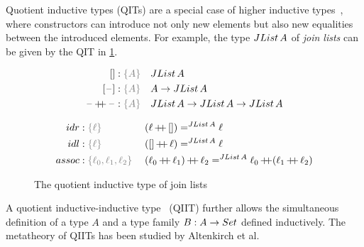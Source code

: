 \documentclass[a4paper,UKenglish,numberwithinsect,cleveref,thm-restate]{lipics-v2021}
\begin{document}
Quotient inductive types (QITs) are a special case of higher inductive types~\cite{Lumsdaine2020}, where constructors can introduce not only new elements but also new equalities between the introduced elements.
%
%
For example, the type $\JList{A}$ of \emph{join lists} can be given by the QIT in \cref{fig:QIT-join-list}.
\begin{figure}
\begin{minipage}{.35\textwidth}
\begin{alignat*}{3}
  \Jnil                    & : \implicit{A}      && \JList{A} \\
  \Jsing{\blank}           & : \implicit{A}      && A \to \JList{A} \\
  \Jconcat{\blank}{\blank} & : \implicit{A}      && \JList{A} \to \JList{A} \to \JList{A}
\end{alignat*}
\end{minipage}
\begin{minipage}{.64\textwidth}
\begin{alignat*}{3}
  \mathsf{idr}             & : \implicit{\ell}\; && (\Jconcat{\ell}{\Jnil}) =^{\JList{A}} \ell \\
  \mathsf{idl}             & : \implicit{\ell}\; && (\Jconcat{\Jnil}{\ell}) =^{\JList{A}} \ell \\
  \mathsf{assoc}           & : \implicit{\ell_0, \ell_1, \ell_2}\; && \Jconcat{(\Jconcat{\ell_0}{\ell_1})}{\ell_2} =^{\JList{A}} \Jconcat{\ell_0}{(\Jconcat{\ell_1}{\ell_2})}
\end{alignat*}
\end{minipage}
\caption{The quotient inductive type of join lists}
\label{fig:QIT-join-list}
\end{figure}
A quotient inductive-inductive type~\cite{Altenkirch2018} (QIIT) further allows the simultaneous definition of a type $A$ and a type family $B : A \to \Set$ defined inductively.
The metatheory of QIITs has been studied by Altenkirch et al.~\cite{Kaposi2018,Kaposi2019,Kovacs2020}
\end{document}
